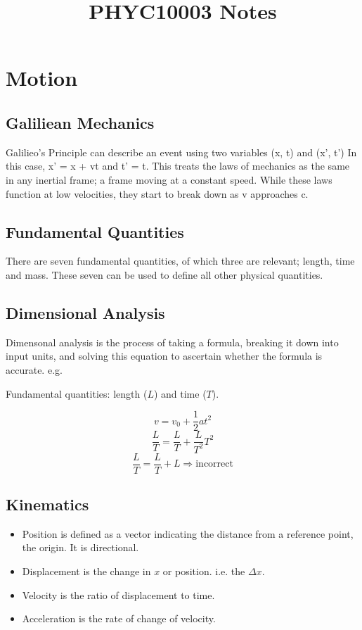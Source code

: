 \documentclass[12pt]{report}
\begin{document}
\title{PHYC10003 Notes}
\chapter*{Motion}

\section*{Galiliean Mechanics}
Galilieo's Principle can describe an event using two variables (x, t) and (x', t')
In this case, x' = x + vt and t' = t. This treats the laws of mechanics as the 
same in any inertial frame; a frame moving at a constant speed. While these laws
function at low velocities, they start to break down as v approaches c.

\section*{Fundamental Quantities}
There are seven fundamental quantities, of which three are relevant; length, time
and mass. These seven can be used to define all other physical quantities.

\section*{Dimensional Analysis}
Dimensonal analysis is the process of taking a formula, breaking it down into input
units, and solving this equation to ascertain whether the formula is accurate. e.g.
\bigskip
\begin{center}
    Fundamental quantities: length (\(L\)) and time (\(T\)).
\end{center}
\[v = v_0 + \frac{1}{2}at^2\]
\[\frac{L}{T} = \frac{L}{T} + \frac{L}{T^2}T^2\]
\[\frac{L}{T} = \frac{L}{T} + L \Rightarrow \mathrm{incorrect}\]

\section*{Kinematics}
\begin{itemize}
    \item Position is defined as a vector indicating the distance from a reference point, the origin. It is directional.
    \item Displacement is the change in \(x\) or position. i.e. the \(\Delta x\).
    \item Velocity is the ratio of displacement to time. 
    \item Acceleration is the rate of change of velocity.
\end{itemize}
\end{document}
